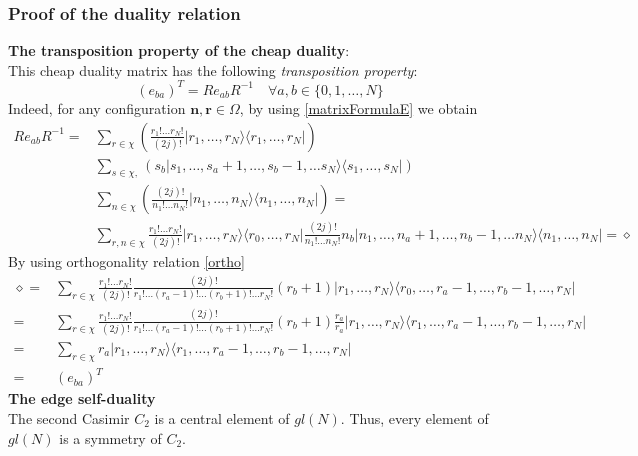 \documentclass[11pt]{article}
\numberwithin{equation}{section}
\begin{document}
\subsubsection{Proof of the duality relation}
\textbf{The transposition property of the cheap duality}: \\
This cheap duality matrix has the following \textit{transposition property}:
\begin{equation}\label{transpositionR}
	\left(e_{ba}\right)^{T}=R e_{ab}R^{-1}\quad \forall a,b\in\{0,1,\ldots,N\}
\end{equation}
Indeed, for any configuration $\mathbf{n},\mathbf{r}\in \Omega$, by using \eqref{matrixFormulaE} we obtain
\begin{align*}
	R e_{ab}R^{-1}=&\sum_{r\in\chi}\left(\frac{r_{1}!\ldots r_{N}!}{(2j)!}|r_{1},\ldots,r_{N}\rangle \langle r_{1},\ldots, r_{N}|\right)
	\\&
	\sum_{s\in \chi,}\left(s_{b}|s_{1},\ldots,s_{a}+1,\ldots,s_{b}-1,\ldots s_{N}\rangle \langle s_{1},\ldots,s_{N}|\right)
	\\&
	\sum_{n\in\chi}\left(\frac{(2j)!}{n_{1}!\ldots n_{N}!}|n_{1},\ldots,n_{N}\rangle \langle n_{1},\ldots, n_{N}|\right)=
	\\&
	\sum_{r,n\in \chi}\frac{r_{1}!\ldots r_{N}!}{(2j)!}|r_{1},\ldots,r_{N}\rangle \langle r_{0},\ldots, r_{N}|
	\frac{(2j)!}{n_{1}!\ldots n_{N}!}n_{b}|n_{1},\ldots,n_{a}+1,\ldots,n_{b}-1,\ldots n_{N}\rangle \langle n_{1},\ldots,n_{N}|=\diamond
\end{align*}
By using orthogonality relation \eqref{ortho}\begin{align*}
\diamond=&\sum_{r\in \chi}\frac{r_{1}!\ldots r_{N}!}{(2j)!}\frac{(2j)!}{r_{1}!\ldots (r_{a}-1)!\ldots(r_{b}+1)!\ldots r_{N}!}(r_{b}+1)|r_{1},\ldots,r_{N}\rangle \langle r_{0},\ldots,r_{a}-1,\ldots,r_{b}-1,\ldots,r_{N}|
	\\=&\sum_{r\in\chi}\frac{r_{1}!\ldots r_{N}!}{(2j)!}\frac{(2j)!}{r_{1}!\ldots (r_{a}-1)!\ldots(r_{b}+1)!\ldots r_{N}!}(r_{b}+1)\frac{r_{a}}{r_{a}}|r_{1},\ldots,r_{N}\rangle \langle r_{1},\ldots,r_{a}-1,\ldots,r_{b}-1,\ldots,r_{N}|
	\\=&\sum_{r\in \chi}
	r_{a}|r_{1},\ldots,r_{N}\rangle \langle r_{1},\ldots,r_{a}-1,\ldots,r_{b}-1,\ldots,r_{N}|
	\\=&
	\left(e_{ba}\right)^{T}
\end{align*}
\textbf{The edge self-duality}\\
The second Casimir $C_{2}$ is a central element of $gl(N)$. Thus, every element of $gl(N)$ is a symmetry of $C_{2}$.
\end{document}
